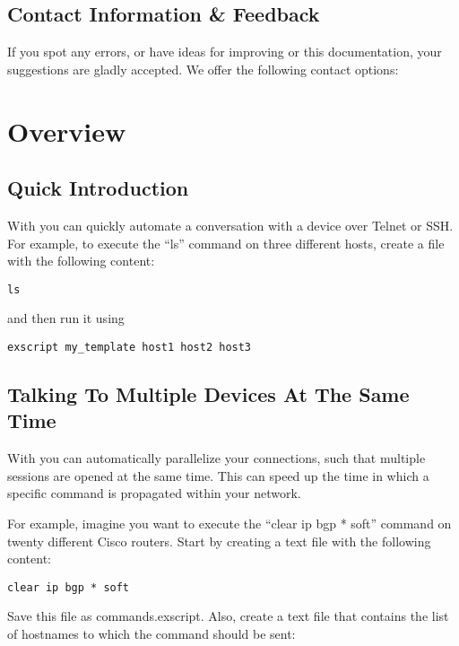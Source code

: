 \subsection{Contact Information \& Feedback}

If you spot any errors, or have ideas for improving \product or this 
documentation, your suggestions are gladly accepted.
We offer the following contact options: \\



\newpage
\section{Overview}
\subsection{Quick Introduction}

With \product you can quickly automate a conversation with a device over 
Telnet or SSH. For example, to execute the ``ls'' command on three different 
hosts, create a file with the following content: 

\begin{lstlisting}
ls
\end{lstlisting}

and then run it using

\begin{lstlisting}
exscript my_template host1 host2 host3
\end{lstlisting}


\subsection{Talking To Multiple Devices At The Same Time}

With \product you can automatically parallelize your connections, such that 
multiple sessions are opened at the same time. This can speed up the time 
in which a specific command is propagated within your network.

For example, imagine you want to execute the ``clear ip bgp * soft'' 
command on twenty different Cisco routers. Start by creating a text file 
with the following content: 

\begin{lstlisting}
clear ip bgp * soft
\end{lstlisting}

Save this file as commands.exscript. Also, create a text file that contains 
the list of hostnames to which the command should be sent: 


